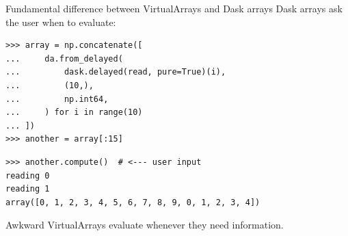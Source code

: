 \documentclass[aspectratio=169]{beamer}
\begin{document}
\begin{frame}[fragile]{Fundamental difference between VirtualArrays and Dask arrays}
\Large
\vspace{0.25 cm}
Dask arrays ask the user when to evaluate:

\small
\begin{verbatim}
>>> array = np.concatenate([
...     da.from_delayed(
...         dask.delayed(read, pure=True)(i),
...         (10,),
...         np.int64,
...     ) for i in range(10)
... ])
>>> another = array[:15]
\end{verbatim}
\begin{verbatim}
>>> another.compute()  # <--- user input
reading 0
reading 1
array([0, 1, 2, 3, 4, 5, 6, 7, 8, 9, 0, 1, 2, 3, 4])
\end{verbatim}

\Large
\vspace{0.5 cm}
Awkward VirtualArrays evaluate whenever they need information.
\end{frame}
\end{document}

